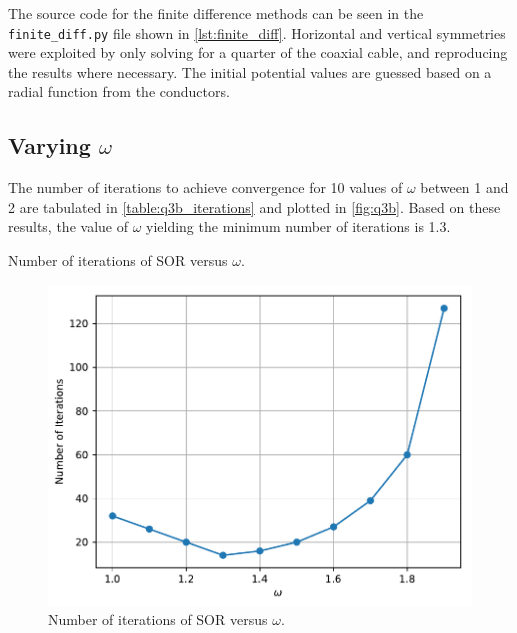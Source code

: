 \documentclass[a4paper,titlepage]{article}
\begin{document}
	The source code for the finite difference methods can be seen in the \texttt{finite_diff.py} file shown in \autoref{lst:finite_diff}. Horizontal and vertical symmetries were exploited by only solving for a quarter of the coaxial cable, and reproducing the results where necessary. The initial potential values are guessed based on a radial function from the conductors.
	
	\subsection{Varying $\omega$}
	
	The number of iterations to achieve convergence for 10 values of $\omega$ between 1 and 2 are tabulated in \autoref{table:q3b_iterations} and plotted in \autoref{fig:q3b}. Based on these results, the value of $\omega$ yielding the minimum number of iterations is 1.3.
	
	\begin{table}[!htb]
		\centering
		\caption{Number of iterations of SOR versus $\omega$.}
		\label{table:q3b_iterations}
	\end{table}
	
	\begin{figure}[!htb]
		\centering
		\includegraphics[width=\columnwidth]{plots/q3b.pdf}
		\caption
		{Number of iterations of SOR versus $\omega$.}
		\label{fig:q3b}
	\end{figure}
\end{document}
